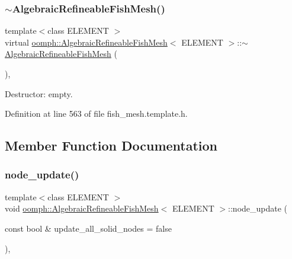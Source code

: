 \subsubsection{\texorpdfstring{$\sim$\+Algebraic\+Refineable\+Fish\+Mesh()}{~AlgebraicRefineableFishMesh()}}
{\footnotesize\ttfamily template$<$class E\+L\+E\+M\+E\+NT $>$ \\
virtual \hyperlink{classoomph_1_1AlgebraicRefineableFishMesh}{oomph\+::\+Algebraic\+Refineable\+Fish\+Mesh}$<$ E\+L\+E\+M\+E\+NT $>$\+::$\sim$\hyperlink{classoomph_1_1AlgebraicRefineableFishMesh}{Algebraic\+Refineable\+Fish\+Mesh} (\begin{DoxyParamCaption}{ }\end{DoxyParamCaption})\hspace{0.3cm}{\ttfamily [inline]}, {\ttfamily [virtual]}}



Destructor\+: empty. 



Definition at line 563 of file fish\+\_\+mesh.\+template.\+h.



\subsection{Member Function Documentation}
\mbox{\label{classoomph_1_1AlgebraicRefineableFishMesh_a8123da4b48355b39f19e0494a9d4545c}} 
\subsubsection{\texorpdfstring{node\+\_\+update()}{node\_update()}}
{\footnotesize\ttfamily template$<$class E\+L\+E\+M\+E\+NT $>$ \\
void \hyperlink{classoomph_1_1AlgebraicRefineableFishMesh}{oomph\+::\+Algebraic\+Refineable\+Fish\+Mesh}$<$ E\+L\+E\+M\+E\+NT $>$\+::node\+\_\+update (\begin{DoxyParamCaption}\item[{const bool \&}]{update\+\_\+all\+\_\+solid\+\_\+nodes = {\ttfamily false} }\end{DoxyParamCaption})\hspace{0.3cm}{\ttfamily [inline]}, {\ttfamily [virtual]}}



